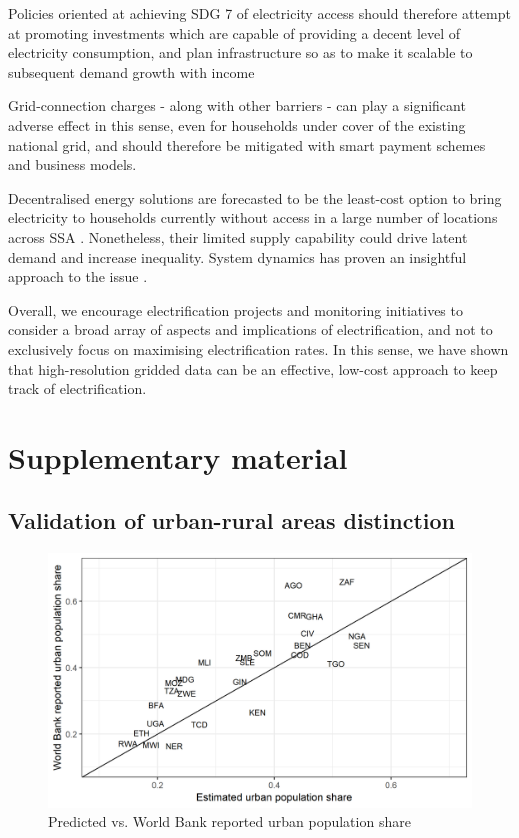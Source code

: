 \documentclass[preprint,12pt]{elsarticle}
\begin{document}
Policies oriented at achieving SDG 7 of electricity access should therefore attempt at promoting investments which are capable of providing a decent level of electricity consumption, and plan infrastructure so as to make it scalable to subsequent demand growth with income \citep{bazilian_energy_2012}

Grid-connection charges - along with other barriers \citep{lee_barriers_2014} - can play a significant adverse effect in this sense, even for households under cover of the existing national grid, and should therefore be mitigated with smart payment schemes \citep{golumbeanu_connection_2013} and business models. 

Decentralised energy solutions are forecasted to be the least-cost option to bring electricity to households currently without access in a large number of locations across SSA \citep{dagnachew_role_2017}. Nonetheless, their limited supply capability could drive latent demand and increase inequality. System dynamics has proven an insightful approach to the issue \citep{riva_merry-go-round_2018}. 

Overall, we encourage electrification projects and monitoring initiatives to consider a broad array of aspects and implications of electrification, and not to exclusively focus on maximising electrification rates. In this sense, we have shown that high-resolution gridded data can be an effective, low-cost approach to keep track of electrification. 

\section*{Supplementary material}
\renewcommand{\thefigure}{A.\arabic{figure}}
\setcounter{figure}{0}
\subsection*{Validation of urban-rural areas distinction}

\begin{figure}[H]
    \centering
    \includegraphics[scale=0.8]{figures/urbanvalid.png}
    \caption{Predicted vs. World Bank reported urban population share}
\end{figure}
\end{document}
